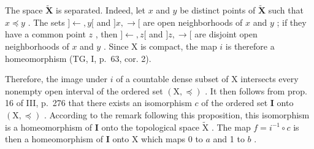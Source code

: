 The space \(\widetilde{\mathbf{X}}\) is separated. Indeed, let \(x\) and \(y\) be distinct points of \(\widetilde{\mathbf{X}}\) such that \(x \preccurlyeq y\) . The sets \(]\leftarrow, y[\) and \(]x, \rightarrow[\) are open neighborhoods of \(x\) and \(y\) ; if they have a common point \(z\) , then \(]\leftarrow, z[\) and \(]z, \rightarrow[\) are disjoint open neighborhoods of \(x\) and \(y\) . Since X is compact, the map \(i\) is therefore a homeomorphism (TG, I, p.~63, cor. 2).

Therefore, the image under \(i\) of a countable dense subset of X intersects every nonempty open interval of the ordered set \((\mathrm{X}, \preccurlyeq)\) . It then follows from prop. 16 of III, p.~276 that there exists an isomorphism \(c\) of the ordered set \(\mathbf{I}\) onto \((\mathrm{X}, \preccurlyeq)\) . According to the remark following this proposition, this isomorphism is a homeomorphism of \(\mathbf{I}\) onto the topological space \(\widetilde{\mathrm{X}}\) . The map \(f = i^{-1} \circ c\) is then a homeomorphism of \(\mathbf{I}\) onto X which maps 0 to \(a\) and 1 to \(b\) .

